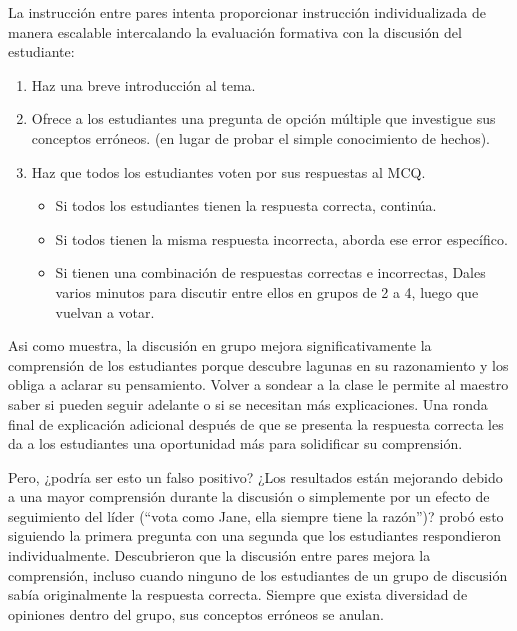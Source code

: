 La instrucción entre pares intenta proporcionar instrucción individualizada de manera escalable
intercalando la evaluación formativa con la discusión del estudiante:

\begin{enumerate}

\item
  Haz una breve introducción al tema.

\item
  Ofrece a los estudiantes una pregunta de opción múltiple que investigue sus conceptos erróneos.
  (en lugar de probar el simple conocimiento de hechos).

\item
  Haz que todos los estudiantes voten por sus respuestas al MCQ.

  \begin{itemize}

  \item
    Si todos los estudiantes tienen la respuesta correcta, continúa.

  \item
    Si todos tienen la misma respuesta incorrecta,
    aborda ese error específico.

  \item
    Si tienen una combinación de respuestas correctas e incorrectas,
    Dales varios minutos para discutir entre ellos en grupos de 2 a 4,
    luego que vuelvan a votar.

  \end{itemize}

\end{enumerate}

Asi como
 muestra,
la discusión en grupo mejora significativamente la comprensión de los estudiantes
porque descubre lagunas en su razonamiento y los obliga a aclarar su pensamiento.
Volver a sondear a la clase le permite al maestro saber si pueden seguir adelante
o si se necesitan más explicaciones.
Una ronda final de explicación adicional después de que se presenta la respuesta correcta
les da a los estudiantes una oportunidad más para solidificar su comprensión.

Pero, ¿podría ser esto un falso positivo?
¿Los resultados están mejorando debido a una mayor comprensión durante la discusión
o simplemente por un efecto de seguimiento del líder (``vota como Jane, ella siempre tiene la razón'')?
\cite{Smit2009} probó esto siguiendo la primera pregunta con una segunda
que los estudiantes respondieron individualmente.
Descubrieron que la discusión entre pares mejora la comprensión,
incluso cuando ninguno de los estudiantes de un grupo de discusión sabía originalmente la respuesta correcta.
Siempre que exista diversidad de opiniones dentro del grupo,
sus conceptos erróneos se anulan.

